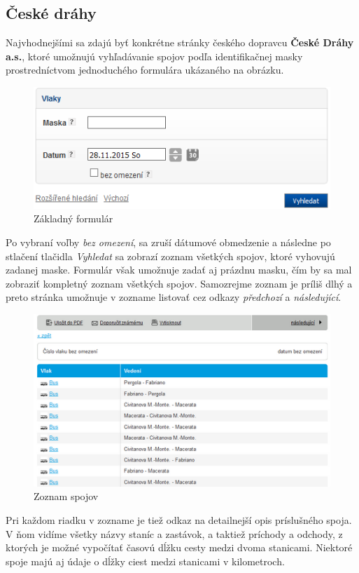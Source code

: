 \documentclass[12pt,twoside,slovak,a4paper]{article}
\begin{document}
	 \subsection{České dráhy}
	 Najvhodnejšími sa zdajú byť konkrétne stránky českého dopravcu \textbf{České Dráhy a.s.}, ktoré umožnujú vyhľadávanie spojov podľa identifikačnej masky prostredníctvom jednoduchého formulára ukázaného na obrázku.	
	 \begin{figure}[H]
	 \caption{Základný formulár}
	 \includegraphics{cd_formular}
	 \end{figure}
	 Po vybraní voľby \emph{bez omezení}, sa zruší dátumové obmedzenie a následne po stlačení tlačidla \emph{Vyhledat} sa zobrazí zoznam všetkých spojov, ktoré vyhovujú zadanej maske. Formulár však umožnuje zadať aj prázdnu masku, čím by sa mal zobraziť kompletný zoznam všetkých spojov. Samozrejme zoznam je príliš dlhý a preto stránka umožnuje v zozname listovať cez odkazy \emph{předchozí} a \emph{následující}.  
	 \begin{figure}[H]
	 \caption{Zoznam spojov}
	 \includegraphics{cd_zoznam}
	 \end{figure}
	 Pri každom riadku v zozname je tiež odkaz na detailnejší opis príslušného spoja. V ňom vidíme všetky názvy staníc a zastávok, a taktiež príchody a odchody, z ktorých je možné vypočítať časovú dĺžku cesty medzi dvoma stanicami. Niektoré spoje majú aj údaje o dĺžky ciest medzi stanicami v kilometroch.  
\end{document}
